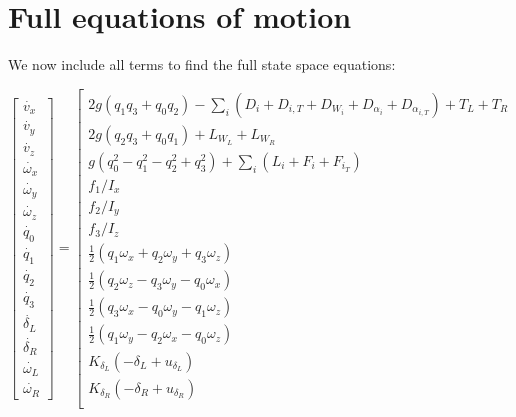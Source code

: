 \section{Full equations of motion}

We now include all terms to find the full state space equations:

\begin{equation}
\left[
\begin{matrix}
    \dot{v_x} \\
    \dot{v_y} \\
    \dot{v_z} \\
    \dot{\omega_x} \\ 
    \dot{\omega_y} \\
    \dot{\omega_z} \\
    \dot{q_0} \\
    \dot{q_1} \\
    \dot{q_2} \\
    \dot{q_3} \\
    \dot{\delta_L} \\
    \dot{\delta_R} \\
    \dot{\omega_L} \\
    \dot{\omega_R} 
\end{matrix} \right] 
=
\left[ \begin{matrix}
 2g(q_1 q_3 + q_0 q_2)
    - \sum_i \left(
     D_i
    + D_{i,T}
    + D_{W_i}
    + D_{\alpha_i}
    + D_{\alpha_{i,T}} \right)
    + T_L + T_R \\
 2g(q_2 q_3 + q_0 q_1)
 + L_{W_L} + L_{W_R} \\
 g(q_0^2 - q_1^2 - q_2^2 + q_3^2)
 + \sum_i \left( L_i + F_i + F_{i_T}
  \right) \\
f_1/I_x \\
f_2/I_y \\
f_3/I_z \\
        \frac{1}{2} (q_1 \omega_x + q_2 \omega_y + q_3 \omega_z) & \\
        \frac{1}{2} (q_2 \omega_z - q_3 \omega_y - q_0 \omega_x) & \\
        \frac{1}{2} (q_3 \omega_x - q_0 \omega_y - q_1 \omega_z) & \\
        \frac{1}{2} (q_1 \omega_y - q_2 \omega_x - q_0 \omega_z) & \\
K_{\delta_L} (-\delta_L + u_{\delta_L}) \\
K_{\delta_R} (-\delta_R + u_{\delta_R}) \\

\end{matrix}
\end{equation}
